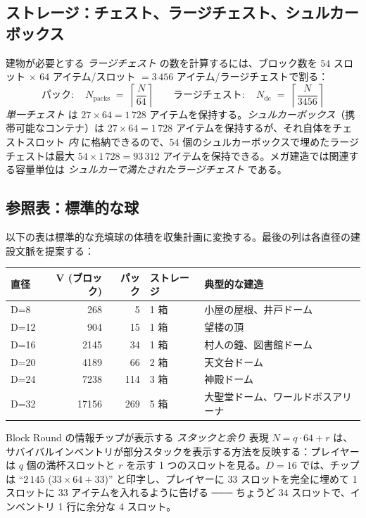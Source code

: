 \documentclass[12pt,a4paper]{scrartcl}
\begin{document}
\subsection{ストレージ：チェスト、ラージチェスト、シュルカーボックス}
建物が必要とする \emph{ラージチェスト} の数を計算するには、ブロック数を $54$ スロット $\times$ $64$ アイテム/スロット $= 3\,456$ アイテム/ラージチェストで割る：
\[
\text{パック}:\quad N_{\mathrm{packs}} \;=\; \left\lceil \dfrac{N}{64} \right\rceil
\qquad
\text{ラージチェスト}:\quad N_{\mathrm{dc}} \;=\; \left\lceil \dfrac{N}{3456} \right\rceil
\]
\emph{単一チェスト} は $27 \times 64 = 1\,728$ アイテムを保持する。\emph{シュルカーボックス}（携帯可能なコンテナ）は $27 \times 64 = 1\,728$ アイテムを保持するが、それ自体をチェストスロット \emph{内} に格納できるので、$54$ 個のシュルカーボックスで埋めたラージチェストは最大 $54 \times 1\,728 = 93\,312$ アイテムを保持できる。メガ建造では関連する容量単位は \emph{シュルカーで満たされたラージチェスト} である。

\subsection{参照表：標準的な球}
以下の表は標準的な充填球の体積を収集計画に変換する。最後の列は各直径の建設文脈を提案する：
\nopagebreak

\vspace{0.4em}
\begin{center}
\small
\begin{tabularx}{\textwidth}{@{}lrrlX@{}}
\toprule
\textbf{直径} & \textbf{V (ブロック)} & \textbf{パック} & \textbf{ストレージ} & \textbf{典型的な建造} \\
\midrule
D=8   &   268 &  5  &  1 箱 & 小屋の屋根、井戸ドーム  \\
D=12  &   904 & 15  &  1 箱 & 望楼の頂 \\
D=16  &  2145 & 34  &  1 箱 & 村人の鐘、図書館ドーム \\
D=20  &  4189 & 66  &  2 箱 & 天文台ドーム \\
D=24  &  7238 & 114 &  3 箱 & 神殿ドーム \\
D=32  & 17156 & 269 &  5 箱 & 大聖堂ドーム、ワールドボスアリーナ \\
\bottomrule
\end{tabularx}
\end{center}

Block Round の情報チップが表示する \emph{スタックと余り} 表現 $N = q \cdot 64 + r$ は、サバイバルインベントリが部分スタックを表示する方法を反映する：プレイヤーは $q$ 個の満杯スロットと $r$ を示す 1 つのスロットを見る。$D=16$ では、チップは \enquote{$2\,145$ ($33 \times 64 + 33$)} と印字し、プレイヤーに $33$ スロットを完全に埋めて 1 スロットに $33$ アイテムを入れるように告げる ─── ちょうど $34$ スロットで、インベントリ 1 行に余分な 4 スロット。
\end{document}
